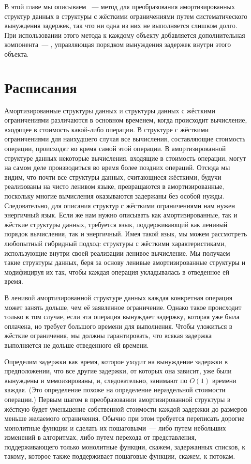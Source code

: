 В этой главе мы описываем ~--- метод для
преобразования амортизированных структур данных в структуры с жёсткими
ограничениями путем систематического вынуждения задержек, так что ни
одна из них не выполняется слишком долго. При использовании этого
метода к каждому объекту добавляется дополнительная компонента~---
, управляющая порядком вынуждения задержек
внутри этого объекта.

\section{Расписания}
\label{sc:7.1}

Амортизированные структуры данных и структуры данных с жёсткими
ограничениями различаются в основном временем, когда происходит вычисление,
входящее в стоимость какой-либо операции. В структуре с жёсткими ограничениями для
наихудшего случая все вычисления, составляющие стоимость операции,
происходят во время самой этой операции. В амортизированной структуре
данных некоторые вычисления, входящие в стоимость операции, могут на
самом деле производиться во время более поздних операций. Отсюда мы
видим, что почти все структуры данных, считающиеся жёсткими, будучи
реализованы на чисто ленивом языке, превращаются в амортизированные,
поскольку многие вычисления оказываются задержаны без особой нужды.
Следовательно, для описания структур с жёсткими ограничениями нам
нужен энергичный язык. Если же нам нужно описывать как
амортизированные, так и жёсткие структуры данных, требуется язык,
поддерживающий как ленивый порядок вычисления, так и
энергичный. Имея такой язык, мы можем рассмотреть любопытный
гибридный подход: структуры с жёсткими характеристиками, использующие
внутри своей реализации ленивое вычисление. Мы получаем такие
структуры данных, беря за основу ленивые амортизированные структуры и
модифицируя их так, чтобы каждая операция укладывалась в отведенное ей
время.

В ленивой амортизированной структуре данных каждая конкретная операция
может занять дольше, чем её заявленное ограничение. Однако такое
происходит только в том случае, если эта операция вынуждает задержку,
которая уже была оплачена, но требует большого времени для
выполнения. Чтобы уложиться в жёсткие ограничения, мы должны
гарантировать, что всякая задержка выполняется не дольше отведенного
ей времени.

Определим  задержки как
время, которое уходит на вынуждение задержки в предположении, что все
другие задержки, от которых она зависит, уже были вынуждены и
мемоизированы, и, следовательно, занимают по $O(1)$ времени
каждая. (Это определение похоже на определение нераздельной стоимости
операции.) Первым шагом в преобразовании амортизированной структуры в
жёсткую будет уменьшение собственной стоимости каждой
задержки до размеров меньше желаемого ограничения. Обычно при этом
требуется переписать дорогие монолитные функции и сделать их
пошаговыми~--- либо путем небольших изменений в алгоритмах, либо путем
перехода от представления, поддерживающего только монолитные функции,
скажем, задержанных списков, к такому, которое также поддерживает
пошаговые функции, скажем, к потокам.

